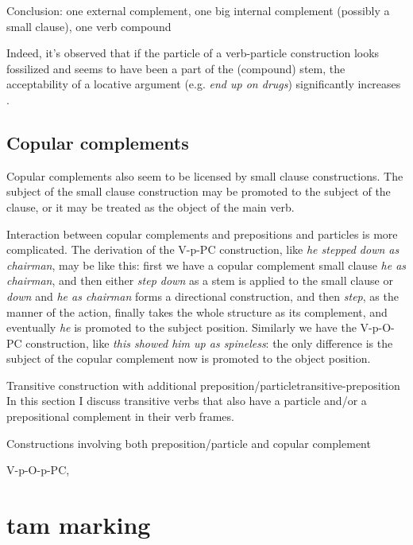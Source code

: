 \documentclass[UTF8, a4paper, oneside, scheme=plain, 12pt]{ctexbook}
\newcommand{\form}[1]{\emph{#1}}
\begin{document}
Conclusion: one external complement, one big internal complement (possibly a small clause), one verb compound

Indeed, it's observed that if the particle of a verb-particle construction looks fossilized 
and seems to have been a part of the (compound) stem, 
the acceptability of a locative argument (e.g. \form{end up on drugs}) significantly increases
\citep{farrell2005english}.

\subsection{Copular complements}

Copular complements also seem to be licensed by small clause constructions.
The subject of the small clause construction may be promoted to the subject of the clause,
or it may be treated as the object of the main verb.

Interaction between copular complements and prepositions and particles is more complicated.
The derivation of the V-p-PC construction, like \form{he stepped down as chairman},
may be like this:
first we have a copular complement small clause \form{he as chairman},
and then either \form{step down} as a stem is applied to the small clause
or \form{down} and \form{he as chairman} forms a directional construction,
and then \form{step}, as the manner of the action, finally takes the whole structure as its complement,
and eventually \form{he} is promoted to the subject position.
Similarly we have the V-p-O-PC construction,
like \form{this showed him up as spineless}:
the only difference is the subject of the copular complement 
now is promoted to the object position.

\begin{todobox}{Transitive construction with additional preposition/particle}{transitive-preposition}
    In this section I discuss 
    transitive verbs that also have a particle and/or a prepositional complement 
    in their verb frames. 
     
    Constructions involving both preposition/particle and copular complement
    
    V-p-O-p-PC, 
\end{todobox}


\section{\acs{tam} marking}\label{sec:verb-phrase.tam}
\end{document}
